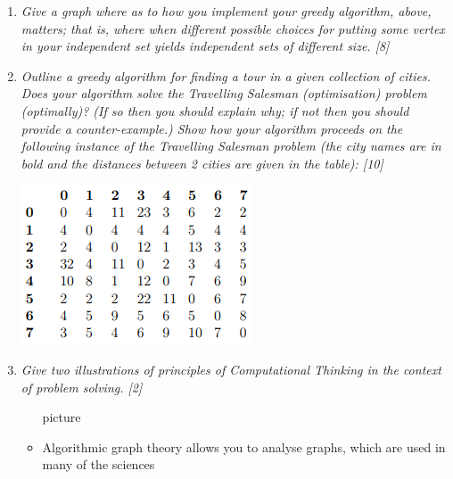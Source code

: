 \documentclass{article}[18pt]
\begin{document}
\begin{enumerate}
	
	
	\item \textit{Give a graph where as to how you implement your greedy algorithm,
		above, matters; that is, where when different possible choices for putting
		some vertex in your independent set yields independent sets of different
		size. [8]}
	\item \textit{Outline a greedy algorithm for finding a tour in a given collection of
		cities. Does your algorithm solve the Travelling Salesman (optimisation)
		problem (optimally)? (If so then you should explain why; if not
		then you should provide a counter-example.) Show how your algorithm
		proceeds on the following instance of the Travelling Salesman problem
		(the city names are in bold and the distances between 2 cities are given
		in the table): [10]}
	\begin{center}
		\includegraphics[scale=0.7]{tsptable}
	\end{center}
	\item \textit{Give two illustrations of principles of Computational Thinking in the
		context of problem solving. [2]}
	\begin{itemize}
		\item [picture]
		\item Algorithmic graph theory allows you to analyse graphs, which are used in many of the sciences
	\end{itemize}
\end{enumerate}
\end{document}
